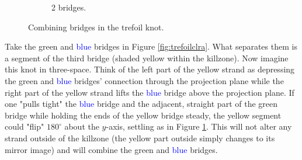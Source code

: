 \documentclass[titlepage,11pt]{article}
\begin{document}
\begin{figure}[h!]
\begin{subfigure}[b]{0.3\linewidth}
        \caption{2 bridges.}
        \label{fig:trefoilclrb}
    \end{subfigure}
    \caption{Combining bridges in the trefoil knot.}
    \label{fig:trefoilclr}
\end{figure}

Take the \textcolor{grx}{green} and \textcolor{blue}{blue} bridges in Figure \ref{fig:trefoilclra}. What separates them is a segment of the third bridge (shaded \textcolor{ylx}{yellow} within the killzone). Now imagine this knot in three-space. Think of the left part of the \textcolor{ylx}{yellow} strand as depressing the \textcolor{grx}{green} and \textcolor{blue}{blue} bridges' connection through the projection plane while the right part of the \textcolor{ylx}{yellow} strand lifts the \textcolor{blue}{blue} bridge above the projection plane. If one "pulls tight" the \textcolor{blue}{blue} bridge and the adjacent, straight part of the \textcolor{grx}{green} bridge while holding the ends of the \textcolor{ylx}{yellow} bridge steady, the \textcolor{ylx}{yellow} segment could "flip" $180^\circ$ about the $y$-axis, settling as in Figure \ref{fig:trefoilclrb}. This will not alter any strand outside of the killzone (the \textcolor{ylx}{yellow} part outside simply changes to its mirror image) and will combine the \textcolor{grx}{green} and \textcolor{blue}{blue} bridges.\par
\end{document}
